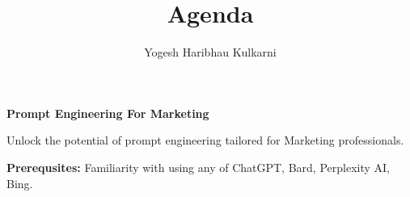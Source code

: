 \documentclass[a4paper, 11pt]{article}
\title{Agenda}
\author{Yogesh Haribhau Kulkarni}
\begin{document}
\pagestyle{mystyle}

\makebox[\linewidth]{}
\begin{center} 
\textbf{\Large Prompt Engineering For Marketing}
\end{center}
\makebox[\linewidth]{}


Unlock the potential of prompt engineering tailored for Marketing professionals.

\makebox[\linewidth]{}
\textbf{Prerequsites:} Familiarity with using any of ChatGPT, Bard, Perplexity AI, Bing.
%
\makebox[\linewidth]{}\\
\end{document}
